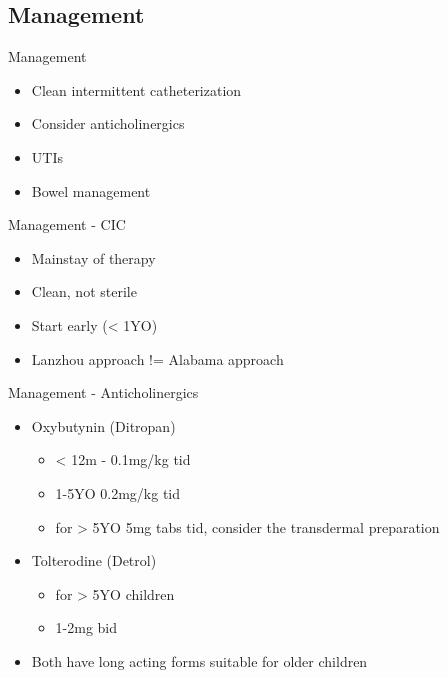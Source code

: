 \subsection{Management}\label{management-2}

\begin{frame}{Management}

\begin{itemize}
\itemsep1pt\parskip0pt
\item
  Clean intermittent catheterization
\item
  Consider anticholinergics
\item
  UTIs
\item
  Bowel management
\end{itemize}

\end{frame}

\begin{frame}{Management - CIC}

\begin{itemize}
\itemsep1pt\parskip0pt
\item
  Mainstay of therapy
\item
  Clean, not sterile
\item
  Start early (\textless{} 1YO)
\item
  Lanzhou approach != Alabama approach
\end{itemize}

\end{frame}

\begin{frame}{Management - Anticholinergics}

\begin{itemize}
\itemsep1pt\parskip0pt
\item
  Oxybutynin (Ditropan)

  \begin{itemize}
  \itemsep1pt\parskip0pt
  \item
    \textless{} 12m - 0.1mg/kg tid
  \item
    1-5YO 0.2mg/kg tid
  \item
    for \textgreater{} 5YO 5mg tabs tid, consider the transdermal
    preparation
  \end{itemize}
\item
  Tolterodine (Detrol)

  \begin{itemize}
  \itemsep1pt\parskip0pt
  \item
    for \textgreater{} 5YO children
  \item
    1-2mg bid
  \end{itemize}
\item
  Both have long acting forms suitable for older children
\end{itemize}

\end{frame}

